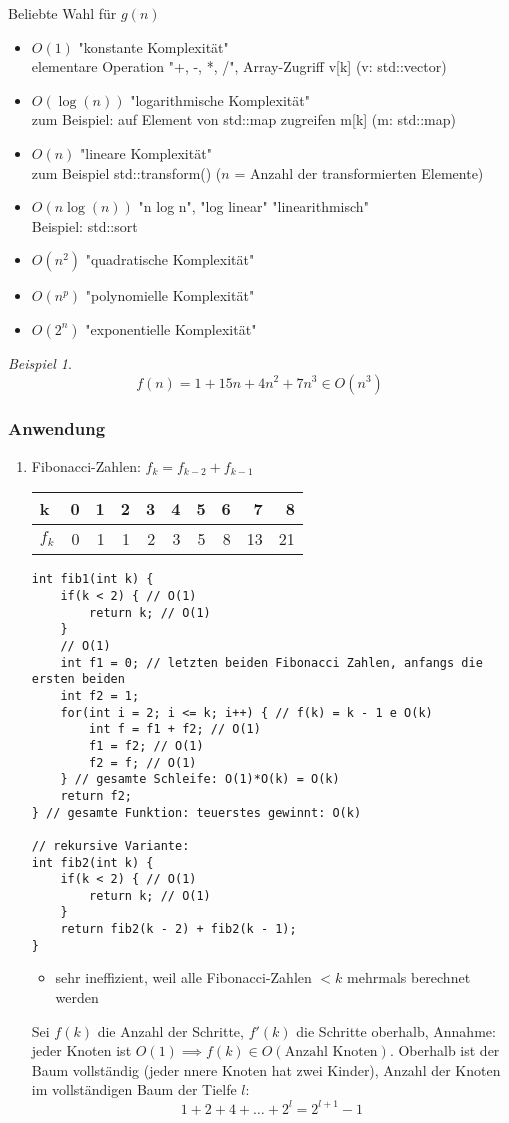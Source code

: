 \documentclass[a4paper]{scrartcl}
\theoremstyle{definition}
\theoremstyle{plain}
\theoremstyle{remark}
\theoremstyle{remark}
\newtheorem{ex}{Beispiel}
\begin{document}
Beliebte Wahl für $g(n)$
\begin{itemize}
\item $O(1)$ \hfill "konstante Komplexität" \\
          elementare Operation "+, -, *, /", Array-Zugriff v[k] (v: std::vector)
\item $O(\log(n))$ \hfill "logarithmische Komplexität" \\
          zum Beispiel: auf Element von std::map zugreifen m[k] (m: std::map)
\item $O(n)$ \hfill "lineare Komplexität" \\
          zum Beispiel std::transform() ($n$ = Anzahl der transformierten Elemente)
\item $O(n \log(n))$ \hfill{"n log n", "log linear" "linearithmisch"} \\
          Beispiel: std::sort
\item $O(n^2)$ \hfill "quadratische Komplexität"
\item $O(n^p)$ \hfill "polynomielle Komplexität"
\item $O(2^n)$ \hfill "exponentielle Komplexität"
\end{itemize}
\begin{ex}
\[f(n) = 1 + 15 n + 4n^2 + 7n^3 \in O(n^3)\]
\end{ex}
\subsubsection{Anwendung}
\label{sec-15-1-3}
\begin{enumerate}
\item Fibonacci-Zahlen: $f_k = f_{k - 2} + f_{k - 1}$
\begin{center}
\begin{tabular}{lrrrrrrrrr}
k & 0 & 1 & 2 & 3 & 4 & 5 & 6 & 7 & 8\\
\hline
$f_k$ & 0 & 1 & 1 & 2 & 3 & 5 & 8 & 13 & 21\\
\end{tabular}
\end{center}
\begin{verbatim}
int fib1(int k) {
	if(k < 2) { // O(1)
		return k; // O(1)
	}
	// O(1)
	int f1 = 0; // letzten beiden Fibonacci Zahlen, anfangs die ersten beiden
	int f2 = 1;
	for(int i = 2; i <= k; i++) { // f(k) = k - 1 e O(k)
		int f = f1 + f2; // O(1)
		f1 = f2; // O(1)
		f2 = f; // O(1)
	} // gesamte Schleife: O(1)*O(k) = O(k)
	return f2;
} // gesamte Funktion: teuerstes gewinnt: O(k)

// rekursive Variante:
int fib2(int k) {
	if(k < 2) { // O(1)
		return k; // O(1)
	}
	return fib2(k - 2) + fib2(k - 1);
}
\end{verbatim}
\begin{itemize}
\item sehr ineffizient, weil alle Fibonacci-Zahlen $< k$  mehrmals berechnet werden
\end{itemize}
Sei $f(k)$  die Anzahl der Schritte, $f'(k)$ die Schritte oberhalb, Annahme: jeder Knoten ist $O(1) \implies f(k) \in O(\text{Anzahl Knoten})$.
Oberhalb ist der Baum vollständig (jeder nnere Knoten hat zwei Kinder), Anzahl der Knoten im vollständigen Baum der Tielfe $l$:
\[1 + 2 + 4 + \ldots + 2^l = 2^{l + 1} - 1\]
\end{enumerate}
\end{document}

